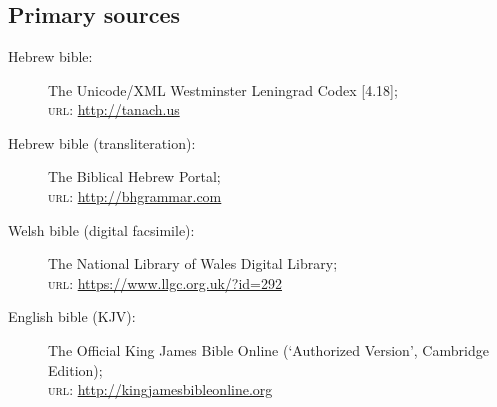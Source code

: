 \nocite{avrahami.y:2012:senses}
\nocite{cohen.e:2014:presentatives}
\nocite{even-shoshan.a:1977:concordance}
\nocite{levy.j:1967:translation}

\section*{\bibname}

\printbibliography[heading=none]

\subsection*{Primary sources}

\begin{description}
	\item [Hebrew bible:] The Unicode/XML Westminster Leningrad Codex [4.18];\\
		\textsc{url}: \url{http://tanach.us}
	\item [Hebrew bible (transliteration):] The Biblical Hebrew Portal;\\
		\textsc{url}: \url{http://bhgrammar.com}
	\item [Welsh bible (digital facsimile):] The National Library of Wales Digital Library;\\
		\textsc{url}: \url{https://www.llgc.org.uk/?id=292}
	\item [English bible (KJV):] The Official King James Bible Online (‘Authorized Version’, Cambridge Edition);\\
		\textsc{url}: \url{http://kingjamesbibleonline.org}
\end{description}
